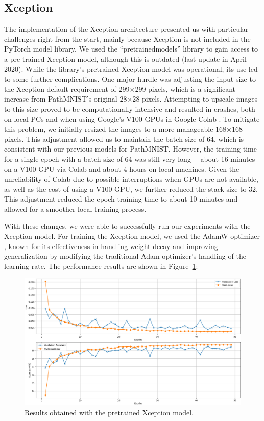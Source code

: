 \subsection{Xception}\label{resultsXceptions}

The implementation of the Xception architecture presented us with particular challenges right from the start, mainly because Xception is not included in the PyTorch model library. We used the ``pretrainedmodels'' library \citep{cadene2023pretrainedmodels} to gain access to a pre-trained Xception model, although this is outdated (last update in April 2020). While the library's pretrained Xception model was operational, its use led to some further complications.
One major hurdle was adjusting the input size to the Xception default requirement of 299$\times$299 pixels, which is a significant increase from PathMNIST's original 28$\times$28 pixels. Attempting to upscale images to this size proved to be computationally intensive and resulted in crashes, both on local PCs and when using Google's V100 GPUs in Google Colab \citep{googlecolab2024}. To mitigate this problem, we initially resized the images to a more manageable 168$\times$168 pixels. This adjustment allowed us to maintain the batch size of 64, which is consistent with our previous models for PathMNIST\@. However, the training time for a single epoch with a batch size of 64 was still very long~-~about 16 minutes on a V100 GPU via Colab and about 4 hours on local machines. Given the unreliability of Colab due to possible interruptions when GPUs are not available, as well as the cost of using a V100 GPU, we further reduced the stack size to 32. This adjustment reduced the epoch training time to about 10 minutes and allowed for a smoother local training process.

With these changes, we were able to successfully run our experiments with the Xception model. For training the Xception model, we used the AdamW optimizer \citep{loshchilov2019decoupled}, known for its effectiveness in handling weight decay and improving generalization by modifying the traditional Adam optimizer's handling of the learning rate. The performance results are shown in Figure~\ref{fig:xception_PathMNIST}:

\begin{figure} [ht]
    \centering
    \includegraphics[width=.8\textwidth]{figures/xception_PathMNIST_result.png}
    \caption{Results obtained with the pretrained Xception model.}\label{fig:xception_PathMNIST}
\end{figure}